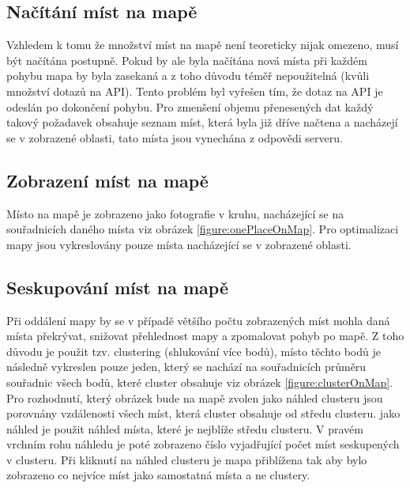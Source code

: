 \documentclass[12pt, a4paper,
 twoside,        %
 openright
]{report}
\begin{document}
\subsection{Načítání míst na mapě}
Vzhledem k tomu že množství míst na mapě není teoreticky nijak omezeno, musí být načítána postupně. Pokud by ale byla načítána nová místa při každém pohybu mapa by byla zasekaná a z toho důvodu téměř nepoužitelná (kvůli množství dotazů na API). Tento problém byl vyřešen tím, že dotaz na API je odeslán po dokončení pohybu. Pro zmenšení objemu přenesených dat každý takový požadavek obsahuje seznam míst, která byla již dříve načtena a nacházejí se v zobrazené oblasti, tato místa jsou vynechána z odpovědi serveru.
\subsection{Zobrazení míst na mapě}
Místo na mapě je zobrazeno jako fotografie v kruhu, nacházející se na souřadnicích daného místa viz obrázek \ref{figure:onePlaceOnMap}. Pro optimalizaci mapy jsou vykreslovány pouze místa nacházející se v zobrazené oblasti.
\subsection{Seskupování míst na mapě}
Při oddálení mapy by se v případě většího počtu zobrazených míst mohla daná místa překrývat, snižovat přehlednost mapy a zpomalovat pohyb po mapě. Z toho důvodu je použit tzv. clustering (shlukování více bodů), místo těchto bodů je následně vykreslen pouze jeden, který se nachází na souřadnicích průměru souřadnic všech bodů, které cluster obsahuje viz obrázek \ref{figure:clusterOnMap}. Pro rozhodnutí, který obrázek bude na mapě zvolen jako náhled clusteru jsou porovnány vzdálenosti všech míst, která cluster obsahuje od středu clusteru. jako náhled je použit náhled místa, které je nejblíže středu clusteru. V pravém vrchním rohu náhledu je poté zobrazeno číslo vyjadřující počet míst seskupených v clusteru. Při kliknutí na náhled clusteru je mapa přiblížena tak aby bylo zobrazeno co nejvíce míst jako samostatná místa a ne clustery.
\end{document}

